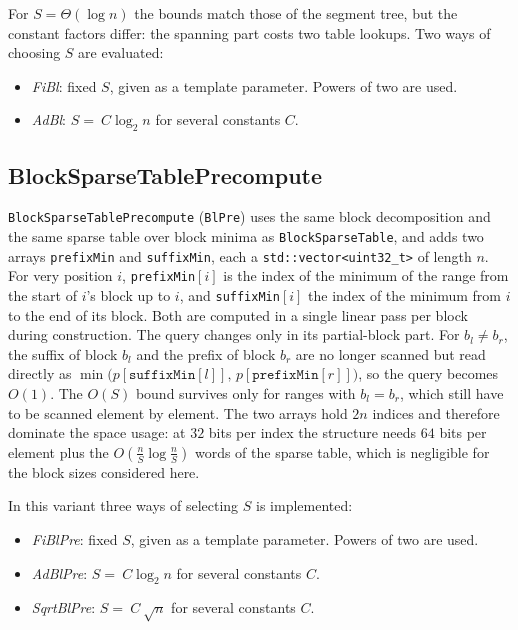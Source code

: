 \documentclass[a4paper,UKenglish,cleveref,thm-restate]{lipics-v2021}
\begin{document}
For $S=\Theta(\log n)$ the bounds match those of the segment tree, but the
constant factors differ: the spanning part costs two table lookups.
Two ways of choosing $S$ are evaluated:

\begin{itemize}
	\item \emph{FiBl}: fixed $S$, given as a template parameter. Powers of two are used.
	\item \emph{AdBl}: $S=\ C\log_2 n$ for several constants $C$.
\end{itemize}

\subsection{BlockSparseTablePrecompute}
\texttt{BlockSparseTablePrecompute} (\texttt{BlPre}) uses the same block decomposition and the same sparse table over block minima as \texttt{BlockSparseTable},
and adds two arrays \texttt{prefixMin} and \texttt{suffixMin}, each a \texttt{std::vector<uint32\_t>} of length $n$.
For very position $i$, \texttt{prefixMin}$[i]$ is the index of the minimum of the range from the start of $i$'s block up to $i$,
and \texttt{suffixMin}$[i]$ the index of the minimum from $i$ to the end of its block.
Both are computed in a single linear pass per block during construction.
The query changes only in its partial-block part.
For $b_l \neq b_r$, the suffix of block $b_l$ and the prefix of block $b_r$ are no longer scanned but read directly as $\min\big(p[\texttt{suffixMin}[l]],\, p[\texttt{prefixMin}[r]]\big)$,
so the query becomes $O(1)$.
The $O(S)$ bound survives only for ranges with $b_l = b_r$, which still have to be scanned element by element.
The two arrays hold $2n$ indices and therefore dominate the space usage: at $32$
bits per index the structure needs $64$ bits per element plus the
$O\!\left(\frac{n}{S}\log\frac{n}{S}\right)$ words of the sparse table, which is
negligible for the block sizes considered here.

In this variant three ways of selecting $S$ is implemented:

\begin{itemize}
	\item \emph{FiBlPre}: fixed $S$, given as a template parameter. Powers of two are used.
	\item \emph{AdBlPre}: $S=\ C\log_2 n$ for several constants $C$.
	\item \emph{SqrtBlPre}: $S=\ C\ \sqrt{n}$ for several constants $C$.
\end{itemize}
\end{document}
